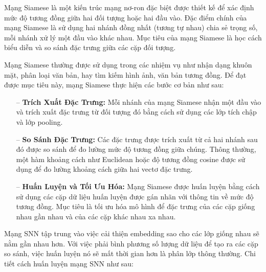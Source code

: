 \documentclass[a4paper, 12pt, openany]{book}
\begin{document}
Mạng Siamese là một kiến trúc mạng nơ-ron đặc biệt được thiết kế để xác định mức độ tương đồng giữa hai đối tượng hoặc hai đầu vào. Đặc điểm chính của mạng Siamese là sử dụng hai nhánh đồng nhất (tương tự nhau) chia sẻ trọng số, mỗi nhánh xử lý một đầu vào khác nhau. Mục tiêu của mạng Siamese là học cách biểu diễn và so sánh đặc trưng giữa các cặp đối tượng.

Mạng Siamese thường được sử dụng trong các nhiệm vụ như nhận dạng khuôn mặt, phân loại văn bản, hay tìm kiếm hình ảnh, văn bản tương đồng. Để đạt được mục tiêu này, mạng Siamese thực hiện các bước cơ bản như sau:

\begin{itemize}
    \item[--] \textbf{Trích Xuất Đặc Trưng:} Mỗi nhánh của mạng Siamese nhận một đầu vào và trích xuất đặc trưng từ đối tượng đó bằng cách sử dụng các lớp tích chập và lớp pooling.

    \item[--] \textbf{So Sánh Đặc Trưng:} Các đặc trưng được trích xuất từ cả hai nhánh sau đó được so sánh để đo lường mức độ tương đồng giữa chúng. Thông thường, một hàm khoảng cách như Euclidean hoặc độ tương đồng cosine được sử dụng để đo lường khoảng cách giữa hai vectơ đặc trưng.

    \item[--] \textbf{Huấn Luyện và Tối Ưu Hóa:} Mạng Siamese được huấn luyện bằng cách sử dụng các cặp dữ liệu huấn luyện được gán nhãn với thông tin về mức độ tương đồng. Mục tiêu là tối ưu hóa mô hình để đặc trưng của các cặp giống nhau gần nhau và của các cặp khác nhau xa nhau.
\end{itemize}

Mạng SNN tập trung vào việc cải thiện embedding sao cho các lớp giống nhau sẽ nằm gần nhau hơn. Với việc phải bình phương số lượng dữ liệu để tạo ra các cặp so sánh, việc huấn luyện nó sẽ mất thời gian hơn là phân lớp thông thường.
Chi tiết cách huấn luyện mạng SNN như sau:
\end{document}
